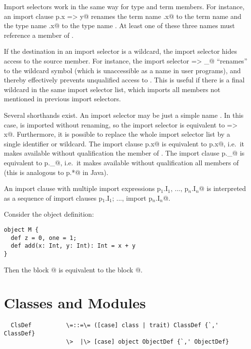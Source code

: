 \documentclass[11pt]{report}
\begin{document}
Import selectors work in the same way for type and term members. For
instance, an import clause \verb@import p.{x => y}@ renames the term
name \verb@p.x@ to the term name \verb@y@ and the type name \verb@p.x@
to the type name \verb@y@. At least one of these three names must
reference a member of \verb@p@.

If the destination in an import selector is a wildcard, the import
selector hides access to the source member. For instance, the import
selector \verb@x => _@ ``renames'' \verb@x@ to the wildcard symbol
(which is unaccessible as a name in user programs), and thereby
effectively prevents unqualified access to \verb@x@. This is useful if
there is a final wildcard in the same import selector list, which
imports all members not mentioned in previous import selectors.

Several shorthands exist. An import selector may be just a simple name
\verb@x@. In this case, \verb@x@ is imported without renaming, so the
import selector is equivalent to \verb@x => x@. Furthermore, it is
possible to replace the whole import selector list by a single
identifier or wildcard. The import clause \verb@import p.x@ is
equivalent to \verb@import p.{x}@, i.e.\ it makes available without
qualification the member \verb@x@ of \verb@p@. The import clause
\verb@import p._@ is equivalent to
\verb@import p.{_}@, 
i.e.\ it makes available without qualification all members of \verb@p@
(this is analogous to \verb@import p.*@ in Java).

An import clause with multiple import expressions
\verb@import p$_1$.I$_1$, ..., p$_n$.I$_n$@ is interpreted as a
sequence of import clauses 
\verb@import p$_1$.I$_1$; ..., import p$_n$.I$_n$@.

\example Consider the object definition:
\begin{verbatim}
object M { 
  def z = 0, one = 1; 
  def add(x: Int, y: Int): Int = x + y 
}
\end{verbatim}
Then the block
@
is equivalent to the block @.

\chapter{Classes and Modules}
\label{sec:globaldefs}

\syntax\begin{verbatim}
  ClsDef          \=::=\= ([case] class | trait) ClassDef {`,' ClassDef}
                  \>  |\> [case] object ObjectDef {`,' ObjectDef}
\end{verbatim}
\end{document}
